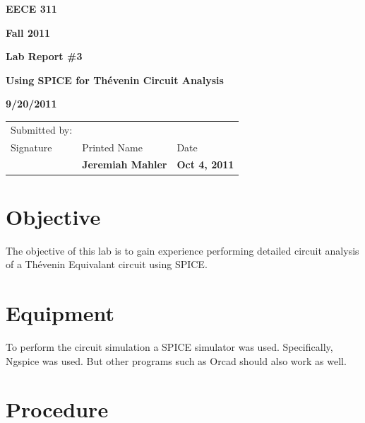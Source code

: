 \documentclass{article}
\begin{document}


\centerline{\bf EECE 311}
\centerline{\bf Fall 2011}
\centerline{\bf}
\centerline{\bf Lab Report \#3}
\centerline{\bf Using SPICE for Th\'{e}venin Circuit Analysis}
\centerline{\bf 9/20/2011}  %

\begin{center}
\begin{tabularx}{\textwidth}[b]{X l l}
Submitted by: & & \\
Signature & Printed Name & Date \\
\hline
\multicolumn{1}{|X|}{} & \multicolumn{1}{|l|}{\bigstrut \bf Jeremiah Mahler} & \multicolumn{1}{|l|}{\bf Oct 4, 2011} \\
\hline
\end{tabularx}
\end{center}


\section{Objective}

The objective of this lab is to gain experience performing detailed
circuit analysis of a
Th\'{e}venin Equivalant \cite[Pg. 119]{nilsson2008electric} circuit
using SPICE.


\section{Equipment}

To perform the circuit simulation a SPICE\cite{wiki:SPICE} simulator was used.
Specifically, Ngspice\cite{NGSPICE} was used.
But other programs such as Orcad\cite{ORCAD} should also work as well.


\section{Procedure}
\end{document}
